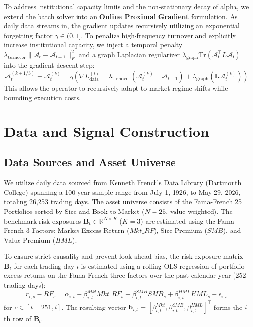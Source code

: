 \documentclass[12pt]{article}
\begin{document}
To address institutional capacity limits and the non-stationary decay of alpha, we extend the batch solver into an \textbf{Online Proximal Gradient} formulation. As daily data streams in, the gradient updates recursively utilizing an exponential forgetting factor $\gamma \in (0, 1]$. To penalize high-frequency turnover and explicitly increase institutional capacity, we inject a temporal penalty $\lambda_{\text{turnover}} \|\mathcal{A}_t - \mathcal{A}_{t-1}\|_F^2$ and a graph Laplacian regularizer $\lambda_{\text{graph}} \text{Tr}(\mathcal{A}_t^\top L \mathcal{A}_t)$ into the gradient descent step:
\begin{equation}
    \mathcal{A}_{t}^{(k+1/3)} = \mathcal{A}_t^{(k)} - \eta \left( \nabla L_{\text{data}}^{(t)} + \lambda_{\text{turnover}} (\mathcal{A}_t^{(k)} - \mathcal{A}_{t-1}) + \lambda_{\text{graph}} (\mathbf{L} \mathcal{A}_t^{(k)}) \right)
\end{equation}
This allows the operator to recursively adapt to market regime shifts while bounding execution costs.

\section{Data and Signal Construction}

\subsection{Data Sources and Asset Universe}
We utilize daily data sourced from Kenneth French's Data Library (Dartmouth College) spanning a 100-year sample range from July 1, 1926, to May 29, 2026, totaling 26,253 trading days. The asset universe consists of the Fama-French 25 Portfolios sorted by Size and Book-to-Market ($N=25$, value-weighted). 
The benchmark risk exposures $\mathbf{B}_t \in \mathbb{R}^{N \times K}$ ($K=3$) are estimated using the Fama-French 3 Factors: Market Excess Return ($Mkt\_RF$), Size Premium ($SMB$), and Value Premium ($HML$).

To ensure strict causality and prevent look-ahead bias, the risk exposure matrix $\mathbf{B}_t$ for each trading day $t$ is estimated using a rolling OLS regression of portfolio excess returns on the Fama-French three factors over the past calendar year (252 trading days):
\begin{equation}
    r_{i, s} - RF_s = \alpha_{i,t} + \beta_{i,t}^{Mkt} Mkt\_RF_s + \beta_{i,t}^{SMB} SMB_s + \beta_{i,t}^{HML} HML_s + \epsilon_{i, s}
\end{equation}
for $s \in [t-251, t]$. The resulting vector $\mathbf{b}_{i,t} = [\beta_{i,t}^{Mkt}, \beta_{i,t}^{SMB}, \beta_{i,t}^{HML}]^\top$ forms the $i$-th row of $\mathbf{B}_t$.
\end{document}
